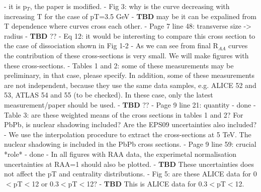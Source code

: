 \documentclass[a4paper,11pt]{article}
\begin{document}
- {\color{blue} it is p$_{T}$, the paper is modified.}
- Fig 3: why is the curve decreasing with increasing T for the case of pT=3.5 GeV \newline
- {\color{red} \textbf{TBD} may be it can be expalined from T dependence where curves cross each other.}
- Page 7 line 48: transverse size -> radius \newline
- {\color{red} \textbf{TBD} ??}
- Eq 12: it would be interesting to compare this cross section to the case of dissociation shown in Fig 1-2 \newline
- {\color{blue} As we can see from final R$_{AA}$ curves the contribution of these cross-sections is very small. We will make
figures with these cross-sections.}
- Tables 1 and 2: some of these measurements may be preliminary, in that case, please specify. In addition, some of these
measurements are not independent, because they use the same data samples, e.g. ALICE 52 and 53, ATLAS 54 and 55 (to be checked).
In these case, only the latest measurement/paper should be used. \newline
- {\color{red} \textbf{TBD} ??}
- Page 9 line 21: quantity \newline
- {\color{blue} done}
- Table 3: are these weighted means of the cross sections in tables 1 and 2? For PbPb, is nuclear shadowing included? Are the EPS09
uncertainties also included? \newline
- {\color{blue} We use the interpolation procedure to extract the cross-sections at 5 TeV. The nuclear shadowing is included in the
PbPb cross sections.}
- Page 9 line 59: crucial *role* \newline
- {\color{blue} done}
- In all figures with RAA data, the experimetal normalisation uncertainties at RAA=1 should also be plotted.\newline 
- {\color{red} \textbf{TBD} These uncertainties does not affect the pT and centrality distributions.}
- Fig 5: are these ALICE data for 0$<$pT$<$12 or 0.3$<$pT$<$12?\newline
- {\color{red} \textbf{TBD} This is ALICE data for 0.3$<$pT$<$12.}










\noindent
\begin{thebibliography}{100}
\medskip



  
\end{thebibliography}
\end{document}
